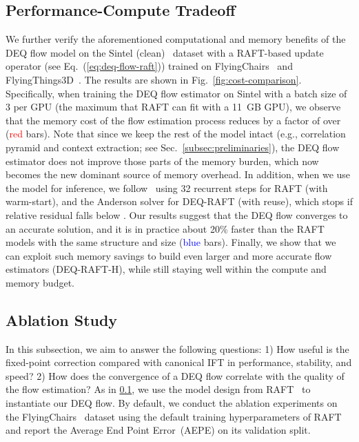 \documentclass[10pt,twocolumn,letterpaper]{article}
\begin{document}
\subsection{Performance-Compute Tradeoff}
\label{subsec:performance-compute-tradeoff}

We further verify the aforementioned computational and memory benefits of the DEQ flow model on the Sintel (clean)~\citep{sintel} dataset with a RAFT-based update operator (see Eq.~(\ref{eq:deq-flow-raft})) trained on FlyingChairs~\citep{flownet} and FlyingThings3D~\citep{mayer2016large}. The results are shown in Fig.~\ref{fig:cost-comparison}. Specifically, when training the DEQ flow estimator on Sintel with a batch size of 3 per GPU (the maximum that RAFT can fit with a 11~GB GPU), we observe that the memory cost of the flow estimation process reduces by a factor of over  (\textcolor{red}{red} bars). Note that since we keep the rest of the model intact (e.g., correlation pyramid and context extraction; see Sec.~\ref{subsec:preliminaries}), the DEQ flow estimator does not improve those parts of the memory burden, which now becomes the new dominant source of memory overhead. In addition, when we use the model for inference, we follow~\citet{RAFT} using 32 recurrent steps for RAFT (with warm-start), and the Anderson solver for DEQ-RAFT (with reuse), which stops if relative residual falls below . Our results suggest that the DEQ flow converges to an accurate solution, and it is in practice about 20\% faster than the RAFT models with the same structure and size (\textcolor{blue}{blue} bars). Finally, we show that we can exploit such memory savings to build even larger and more accurate flow estimators (DEQ-RAFT-H), while still staying well within the compute and memory budget.

\vspace{-0.1cm}
\subsection{Ablation Study}

In this subsection, we aim to answer the following questions: 1) How useful is the fixed-point correction compared with canonical IFT in performance, stability, and speed? 2) How does the convergence of a DEQ flow correlate with the quality of the flow estimation? As in \cref{subsec:performance-compute-tradeoff}, we use the model design from RAFT~\cite{RAFT} to instantiate our DEQ flow. 
By default, we conduct the ablation experiments on the FlyingChairs~\cite{flownet} dataset using the default training hyperparameters of RAFT and report the Average End Point Error~(AEPE) on its validation split. 
\end{document}
